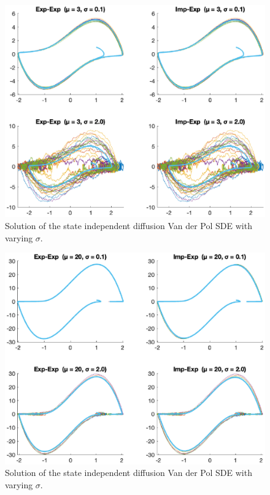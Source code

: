 \begin{figure}[H]
    \centering
    \includegraphics[width=\textwidth]{plots/4b.eps}
    \caption{Solution of the state independent diffusion Van der Pol SDE with varying $\sigma$.}
    \label{fig:4b}
\end{figure}

\begin{figure}[htb]
    \centering
    \includegraphics[width=\textwidth]{plots/4a.eps}
    \caption{Solution of the state independent diffusion Van der Pol SDE with varying $\sigma$.}
    \label{fig:4a}
\end{figure}


